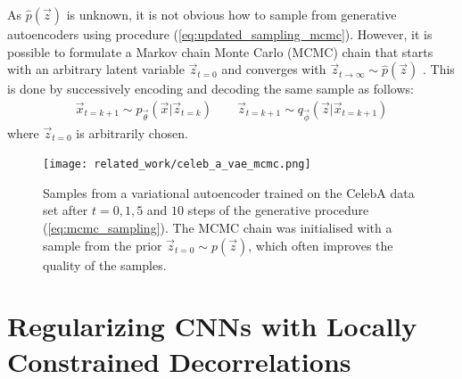 As $\hat{p}(\vec{z})$ is unknown, it is not obvious how to sample from generative autoencoders using procedure (\ref{eq:updated_sampling_mcmc}). However, it is possible to formulate a Markov chain Monte Carlo (MCMC) chain that starts with an arbitrary latent variable $\vec{z}_{t=0}$ and converges with $\vec{z}_{t \rightarrow \infty} \sim \hat{p}(\vec{z})$ \cite{Creswell2016}. This is done by successively encoding and decoding the same sample as follows:
\begin{align}
\vec{x}_{t=k+1} \sim p_{\vec{\theta}}(\vec{x} | \vec{z}_{t=k}) \quad\quad \vec{z}_{t=k+1} \sim q_{\vec{\phi}}(\vec{z} | \vec{x}_{t=k+1})
\label{eq:mcmc_sampling}
\end{align}
where $\vec{z}_{t=0}$ is arbitrarily chosen.

\begin{figure}[H]
\centering
\captionsetup{justification=centering}
\texttt{[image: related\_work/celeb\_a\_vae\_mcmc.png]}
\caption{Samples from a variational autoencoder trained on the CelebA data set after $t = 0, 1, 5$ and $10$ steps of the generative procedure (\ref{eq:mcmc_sampling}). The MCMC chain was initialised with a sample from the prior $\vec{z}_{t=0} \sim p(\vec{z})$, which often improves the quality of the samples. \cite{Creswell2016}}
\label{fig:mcmc_sampling}
\end{figure}



%
%
%
%
%
\section{Regularizing CNNs with Locally Constrained Decorrelations}
\cite{Rodriguez2016}
